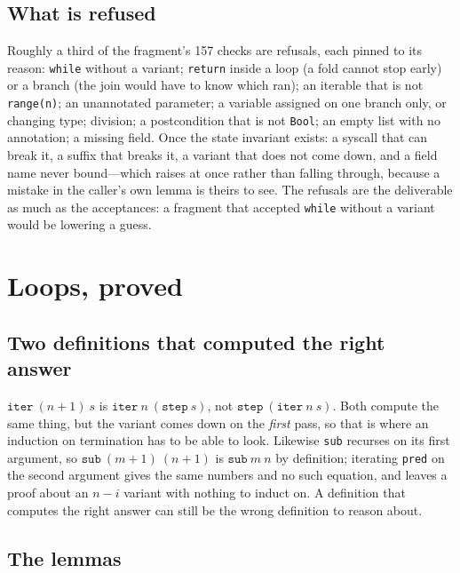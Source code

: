 \documentclass[11pt]{article}
\newcommand{\code}[1]{\texttt{#1}}
\begin{document}
\subsection{What is refused}

Roughly a third of the fragment's 157 checks are refusals, each pinned to its
reason: \code{while} without a variant; \code{return} inside a loop (a fold
cannot stop early) or a branch (the join would have to know which ran); an
iterable that is not \code{range(n)}; an unannotated parameter; a variable
assigned on one branch only, or changing type; division; a postcondition that
is not \code{Bool}; an empty list with no annotation; a missing field. Once the
state invariant exists: a syscall that can break it, a suffix that breaks it,
a variant that does not come down, and a field name never bound---which raises
at once rather than falling through, because a mistake in the caller's own
lemma is theirs to see. The refusals are the deliverable as much as the
acceptances: a fragment that accepted \code{while} without a variant would be
lowering a guess.

\section{Loops, proved}
\label{sec:loops}

\subsection{Two definitions that computed the right answer}

$\code{iter}\ (n{+}1)\ s$ is $\code{iter}\ n\ (\code{step}\ s)$, not
$\code{step}\ (\code{iter}\ n\ s)$. Both compute the same thing, but the
variant comes down on the \emph{first} pass, so that is where an induction on
termination has to be able to look. Likewise \code{sub} recurses on its first
argument, so $\code{sub}\ (m{+}1)\ (n{+}1)$ is $\code{sub}\ m\ n$ by
definition; iterating \code{pred} on the second argument gives the same
numbers and no such equation, and leaves a proof about an $n - i$ variant
with nothing to induct on. A definition that computes the right answer can
still be the wrong definition to reason about.

\subsection{The lemmas}
\end{document}
